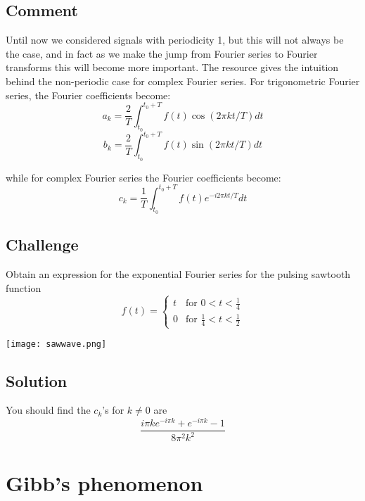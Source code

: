 \subsection*{Comment}
Until now we considered signals with periodicity 1, but this will not always be the case, and in fact as we make the jump from Fourier series to Fourier transforms this will become more important. The resource gives the intuition behind the non-periodic case for complex Fourier series. For trigonometric Fourier series, the Fourier coefficients become:
\begin{equation}
    a_k = \frac{2}{T} \int_{t_0}^{t_0+T} f(t) \cos(2 \pi k t/T) dt
\end{equation}
\begin{equation}
    b_k = \frac{2}{T} \int_{t_0}^{t_0+T} f(t) \sin(2 \pi k t/T) dt
\end{equation}

while for complex Fourier series the Fourier coefficients become:
\begin{equation}
    c_k = \frac{1}{T} \int_{t_0}^{t_0+T} f(t) e^{-i 2 \pi kt/T} dt
\end{equation}

\subsection*{Challenge}
Obtain an expression for the exponential Fourier series for the pulsing sawtooth function
\begin{equation}
    f(t)=
    \begin{cases}
        t & \text{for } 0<t<\frac{1}{4} \\
        0 & \text{for } \frac{1}{4}<t<\frac{1}{2}
    \end{cases}
\end{equation}

\texttt{[image: sawwave.png]}

\subsection*{Solution}
You should find the $c_k$'s for $k \ne 0$ are
\begin{equation}
    \frac{i \pi k e^{-i \pi k} + e^{-i \pi k} - 1}{8 \pi^2 k^2}
\end{equation}



\newpage
\section{Gibb's phenomenon}

